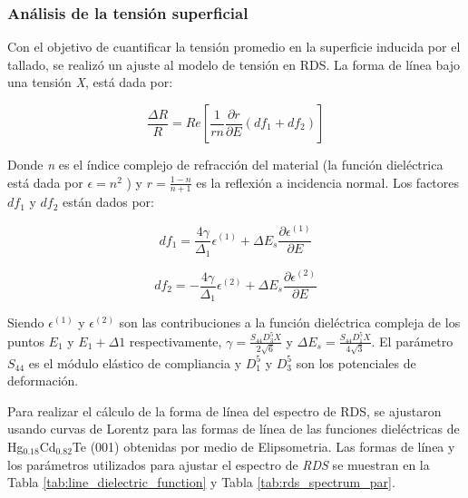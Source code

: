 \subsubsection{Análisis de la tensión superficial}
\label{sec:chap4-hgcdte-rds-stress}
Con el objetivo de cuantificar la tensión promedio en la superficie inducida por el tallado, se realizó un ajuste al modelo de tensión en RDS. La forma de línea bajo una tensión \textit{X}, está dada por\cite{LastrasMartnez2010}:

\begin{equation}
    \frac{\Delta R}{R} = Re [\frac{1}{r n}\frac{\partial r}{\partial E} (df_{1} + df_{2})]
\end{equation}

Donde \textit{n} es el índice complejo de refracción del material (la función dieléctrica está dada por $ \epsilon = n^{2}$ ) y $ r=\frac{1-n}{n+1} $ es la reflexión a incidencia normal. Los factores $df_{1}$ y $df_{2}$ están dados por:

\begin{equation}
    df_{1} = \frac{4\gamma}{\Delta_{1}} \epsilon^{(1)} +  \Delta E_{s}\frac{\partial \epsilon^{(1)}}{\partial E}
\end{equation}

\begin{equation}
    df_{2} = {-\frac{4\gamma}{\Delta_{1}} \epsilon^{(2)}} +  \Delta E_{s}\frac{\partial \epsilon^{(2)}}{\partial E} 
\end{equation}

Siendo $\epsilon^{(1)}$ y $\epsilon^{(2)}$ son las contribuciones a la función dieléctrica compleja de los puntos $E_{1}$ y $E_{1}+\Delta1$ respectivamente, $\gamma = \frac{S_{44} D_{3}^{5} X}{2\sqrt{6}}$ y $\Delta E_{s} = \frac{S_{44} D_{1}^{5} X}{4\sqrt{3}}$. 
El parámetro  $S_{44}$ es el módulo elástico de compliancia y $D_{1}^{5}$ y $D_{3}^{5}$ son los potenciales de deformación.

Para realizar el cálculo de la forma de línea del espectro de RDS, se ajustaron usando curvas de Lorentz para las formas de línea de las funciones dieléctricas de Hg$_{0.18}$Cd$_{0.82}$Te (001) obtenidas por medio de Elipsometria\cite{Camacho2005}. Las formas de línea y los parámetros utilizados para ajustar el espectro de \textit{RDS} se muestran en la Tabla \ref{tab:line_dielectric_function} y Tabla \ref{tab:rds_spectrum_par}\cite{LastrasMartnez2009, LastrasMartnez2010}. 

